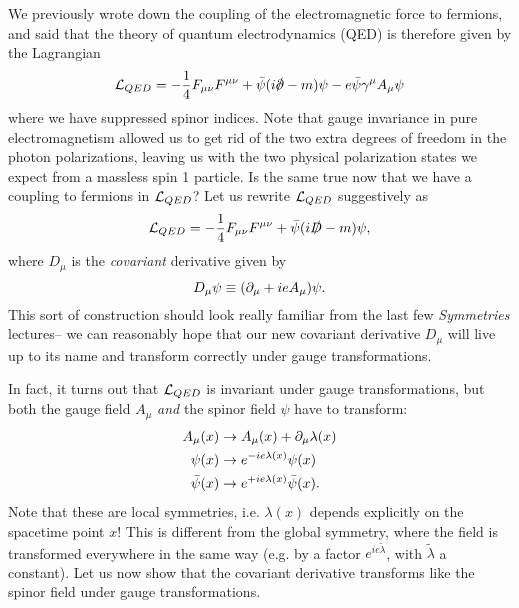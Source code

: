 We previously wrote down the coupling of the electromagnetic force to fermions, and said that the theory of quantum electrodynamics (QED) is therefore given by the Lagrangian
\begin{equation}
    \cL_{QED}=-\frac{1}{4} F_{\mu\nu} F^{\mu\nu}+\bar \psi (i\slashed{\p}-m)\psi -e \bar \psi \gamma^\mu A_\mu \psi
\end{equation}
where we have suppressed spinor indices. Note that gauge invariance in pure electromagnetism allowed us to get rid of the two extra degrees of freedom in the photon polarizations, leaving us with the two physical polarization states we expect from a massless spin 1 particle. Is the same true now that we have a coupling to fermions in $\mathcal L_{QED}$? Let us rewrite $\mathcal L_{QED}$ suggestively as
\begin{equation}
    \mathcal L_{QED}=-\frac{1}{4} F_{\mu\nu} F^{\mu\nu}+\bar \psi (i\slashed{D}-m)\psi,
\end{equation}
where $D_\mu$ is the \emph{covariant} derivative given by
\begin{equation}
    D_\mu \psi \equiv (\partial_\mu+ie A_\mu)\psi.
\end{equation}
This sort of construction should look really familiar from the last few \emph{Symmetries} lectures-- we can reasonably hope that our new covariant derivative $D_\mu$ will live up to its name and transform correctly under gauge transformations.

In fact, it turns out that $\mathcal L_{QED}$ is invariant under gauge transformations, but both the gauge field $A_\mu$ \emph{and} the spinor field $\psi$ have to transform:
\begin{align}
    A_\mu(x) &\to A_\mu(x)+\partial_\mu \lambda(x)\\
    \psi(x) &\to e^{-ie \lambda(x)}\psi(x)\\
    \bar\psi(x) &\to e^{+ie \lambda(x)}\bar\psi(x).
\end{align}
Note that these are local symmetries, i.e. $\lambda(x)$ depends explicitly on the spacetime point $x$! This is different from the global symmetry, where the field is transformed everywhere in the same way (e.g. by a factor $e^{ie\tilde \lambda}$, with $\tilde \lambda$ a constant). Let us now show that the covariant derivative transforms like the spinor field under gauge transformations.


